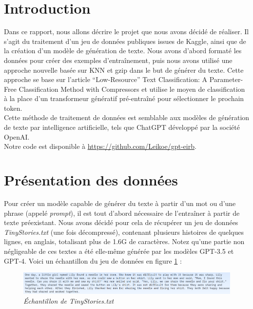 \documentclass[12pt]{article}
\begin{document}
\large
\tableofcontents
\normalsize

\newpage

\section{Introduction}
Dans ce rapport, nous allons décrire le projet que nous avons décidé de réaliser. Il s'agit du traitement d'un jeu de données publiques issues de Kaggle, ainsi que de la création d'un modèle de génération de texte. Nous avons d'abord formaté les données pour créer des exemples d'entraînement, puis nous avons utilisé une approche nouvelle basée sur KNN et gzip dans le but de générer du texte. Cette approche se base sur l'article “Low-Resource” Text Classification: A Parameter-Free Classification Method with Compressors\cite{jiang-etal-2023-low} et utilise le moyen de classification à la place d'un transformeur génératif pré-entraîné pour sélectionner le prochain token.\\

Cette méthode de traitement de données est semblable aux modèles de génération de texte par intelligence artificielle, tels que ChatGPT développé par la société OpenAI.\\
Notre code est disponible à \href{https://github.com/Leikoe/gpt-eirb}{https://github.com/Leikoe/gpt-eirb}.

\section{Présentation des données}
Pour créer un modèle capable de générer du texte à partir d'un mot ou d'une phrase (appelé \textit{prompt}), il est tout d'abord nécessaire de l'entraîner à partir de texte préexistant. Nous avons décidé pour cela de récupérer un jeu de données \textit{TinyStories.txt\cite{eldan2023tinystories}} (une fois décompressé), contenant plusieurs histoires de quelques lignes, en anglais, totalisant plus de 1.6G de caractères. Notez qu'une partie non négligeable de ces textes a été elle-même générée par les modèles GPT-3.5 et GPT-4. Voici un échantillon du jeu de données en figure \ref{fig:echantTS} : 

\begin{figure}[h]
	\centering
    \includegraphics[scale=0.26]{assets/EchantillonTinyStories.png}
    \caption{\textit{Échantillon de TinyStories.txt}}
    \label{fig:echantTS}
\end{figure}
\end{document}
